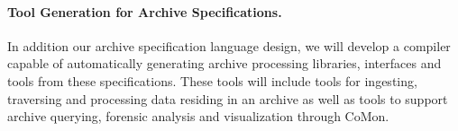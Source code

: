 \paragraph*{Tool Generation for Archive Specifications.}  In addition our archive
specification language design, we will develop a compiler capable of automatically
generating archive processing libraries, interfaces and tools from these specifications.  
These tools will 
include tools for ingesting, traversing and processing data residing in an archive
as well as tools to support archive querying, forensic analysis and visualization through CoMon.